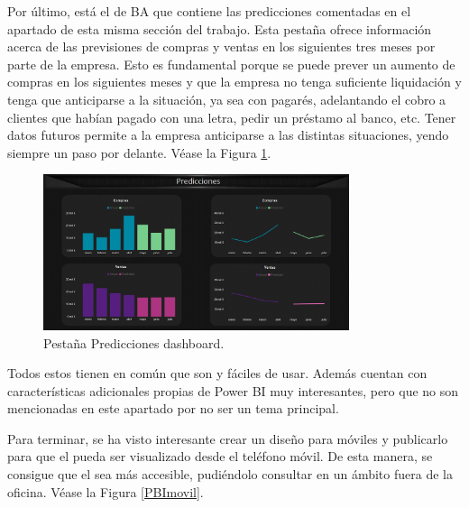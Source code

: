 Por último, está el  de BA que contiene las predicciones comentadas en el apartado  de esta misma sección del trabajo. Esta pestaña ofrece información acerca de las previsiones de compras y ventas en los siguientes tres meses por parte de la empresa. Esto es fundamental porque se puede prever un aumento de compras en los siguientes meses y que la empresa no tenga suficiente liquidación y tenga que anticiparse a la situación, ya sea con pagarés, adelantando el cobro a clientes que habían pagado con una letra, pedir un préstamo al banco, etc. Tener datos futuros permite a la empresa anticiparse a las distintas situaciones, yendo siempre un paso por delante. Véase la Figura \ref{predicciones}.

\begin{figure}[H]
	\centering
	\includegraphics[width= 0.8\textwidth]{imgs/predicciones_dashboard}
	\caption{Pestaña Predicciones dashboard.}
	\label{predicciones}
\end{figure}

Todos estos  tienen en común que son  y fáciles de usar. Además cuentan  con características adicionales propias de Power BI muy interesantes, pero que no son mencionadas en este apartado por no ser un tema principal.

Para terminar, se ha visto interesante crear un diseño para móviles y publicarlo para que el  pueda ser visualizado desde el teléfono móvil. De esta manera, se consigue que el sea más accesible, pudiéndolo consultar en un ámbito fuera de la oficina. Véase la Figura \ref{PBImovil}.

